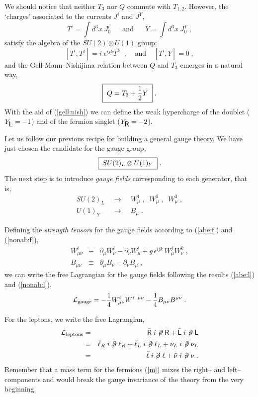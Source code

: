 \documentclass[12pt]{report}
\def\text#1{{\scriptstyle\mathrm{#1}}}
\newcommand{\ld}{\mbox{\sf L}}
\newcommand{\rs}{\mbox{\sf R}}
\newcommand{\lag}{{\cal L}}
\newcommand{\del}{\partial}
\newcommand{\dels}{\not \! \partial}
\begin{document}
We should notice that neither $T_3$ nor $Q$ commute with $T_{1,2}$.
However, the `charges' associated to the currents $J^i$ and $J^Y$,  
\[
T^i = \int d^3 x \; J_0^i \;\;\;\;\;\; \mbox{and} \;\;\;\;\;\;
Y  = \int d^3 x \; J_0^Y \; ,
\]
satisfy the algebra of the $SU(2) \otimes U(1)$ group:
\[
[T^i , T^j] = i \; \epsilon^{ijk} T^k \;\; , \;\;\;\; \mbox{and}
\;\;\;\;
[T^i, Y] = 0 \; ,
\]
and the Gell-Mann--Nishijima relation between $Q$ and $T_3$
emerges in a natural way,
\begin{equation}
\fbox{$ \; \displaystyle{Q = T_3 + \frac{1}{2} Y} \; $} \; .
\label{gell:nish}
\end{equation}
With the aid of (\ref{gell:nish}) we can define the weak hypercharge
of the doublet ($Y_{\ld} = -1$) and of the fermion singlet ($Y_{\rs}
= -2$).

Let us follow our previous recipe for building a general gauge
theory. We have just chosen the candidate for the gauge group,
\[
\fbox{$ \; \displaystyle{SU(2)_L \otimes U(1)_Y} \;  $} \; .
\]
The next step is to introduce {\it gauge fields} corresponding to
each generator, that is,
\begin{eqnarray*}
SU(2)_L \;\; & \longrightarrow & \;\; 
W^1_\mu \; , \;\; W^2_\mu \; , \;\; W^3_\mu \; ,\\
U(1)_Y  \;\; & \longrightarrow & \;\; B_\mu \; .
\end{eqnarray*}

Defining the {\it strength tensors} for the gauge fields according to
(\ref{abe:f}) and (\ref{nonab:f}),
\begin{eqnarray*}
W_{\mu\nu}^i & \equiv & \del_\mu W^i_\nu - \del_\nu W^i_\mu + g \,
\epsilon^{ijk} \, W_\mu^j W_\nu^k \; , \\
B_{\mu\nu} & \equiv & \del_\mu B_\nu - \del_\nu B_\mu \; ,
\end{eqnarray*}
we can write the free Lagrangian for the gauge fields following the
results (\ref{abe:l}) and (\ref{nonab:l}),
\begin{equation}
\lag_{\text{gauge}} = - \frac{1}{4} W_{\mu\nu}^i W^{i \;\; \mu\nu} - 
                        \frac{1}{4} B_{\mu\nu} B^{\mu\nu} \; .
\label{l:gau}
\end{equation}

For the leptons, we write the free Lagrangian,
\begin{eqnarray}
\lag_{\text{leptons}} &=& \bar{\rs} \; i \dels \; \rs + 
                           \bar{\ld} \; i \dels \; \ld \nonumber \\
			&=& \bar{\ell}_R \; i \dels \; \ell_R + 
			    \bar{\ell}_L \; i \dels \; \ell_L +
			    \bar{\nu}_L \; i \dels \; \nu_L  \nonumber \\
	&=& \bar{\ell} \; i \dels \; \ell + \bar{\nu} \; i \dels \;
	\nu \; .
\label{free:fer}
\end{eqnarray}	
Remember that a mass term for the fermions  (\ref{m}) mixes the
right-- and left--components and would break the gauge invariance of
the theory from the very beginning. 
\end{document}
